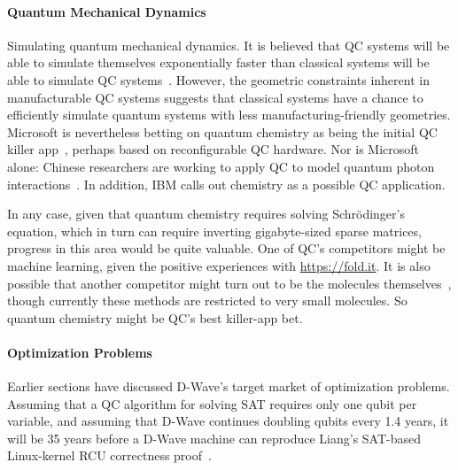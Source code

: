 \paragraph{Quantum Mechanical Dynamics}
\label{sec:future:Quantum Mechanical Dynamics}

Simulating quantum mechanical dynamics.
It is believed that QC systems will be able to simulate themselves
exponentially faster than classical systems will be able to
simulate QC systems~\cite{Feynman1982}.
However, the geometric constraints inherent in manufacturable
QC systems suggests that classical systems have a chance
to efficiently simulate quantum systems with less
manufacturing-friendly geometries.
Microsoft is nevertheless betting on quantum chemistry as being
the initial QC killer app~\cite{TomSimonite2017QC-MS-Chemistry},
perhaps based on reconfigurable QC hardware.
Nor is Microsoft alone: Chinese researchers are working to apply
QC to model quantum photon interactions~\cite{StephenChen2017ChinaQC}.
In addition, IBM calls out chemistry as a possible QC application.

In any case, given that quantum chemistry requires solving
Schr\"{o}dinger's equation, which in turn can require inverting
gigabyte-sized sparse matrices, progress in this area would
be quite valuable.
One of QC's competitors might be machine learning, given the positive
experiences with \url{https://fold.it}.
It is also possible that another competitor might turn out to be the
molecules themselves~\cite{Chin-wenChou2017ManipulateMolecule}, though
currently these methods are restricted to very small molecules.
So quantum chemistry might be QC's best killer-app bet.

\paragraph{Optimization Problems}
\label{sec:future:Optimization Problems}

Earlier sections have discussed D-Wave's target market of optimization
problems.
Assuming that a QC algorithm for solving SAT requires only one qubit
per variable, and assuming that D-Wave continues doubling qubits every
1.4 years, it will be 35 years before a D-Wave machine can reproduce
Liang's SAT-based Linux-kernel RCU correctness
proof~\cite{LihaoLiang2016VerifyTreeRCU}.

